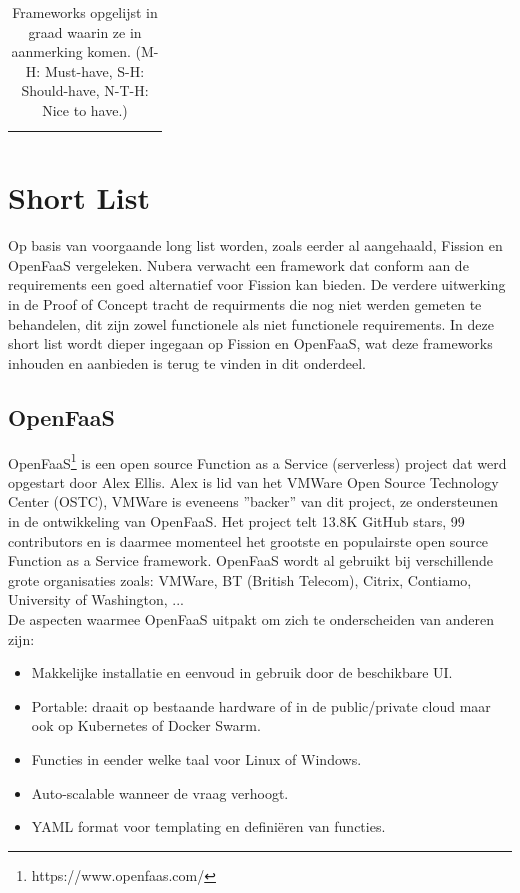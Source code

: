 \begin{table}[]
{\begin{tabular}{@{}llccccccccc@{}}
            &  & \multicolumn{1}{l}{} & \multicolumn{1}{l}{} & \multicolumn{1}{l}{} & \multicolumn{1}{l}{} & \multicolumn{1}{l}{} & \multicolumn{1}{l}{} & \multicolumn{1}{l}{} & \multicolumn{1}{l}{} & \multicolumn{1}{l}{} \\ \bottomrule
        \end{tabular}%
    }
    \caption{Frameworks opgelijst in graad waarin ze in aanmerking komen. (M-H: Must-have, S-H: Should-have, N-T-H: Nice to have.) }
    \label{tab:frameworks-samenvattingl}
\end{table}

\section{Short List}
\label{sec:short-list}
Op basis van voorgaande long list worden, zoals eerder al aangehaald, Fission en OpenFaaS vergeleken. Nubera verwacht een framework dat conform aan de requirements een goed alternatief voor Fission kan bieden. De verdere uitwerking in de Proof of Concept tracht de requirments die nog niet werden gemeten te behandelen, dit zijn zowel functionele als niet functionele requirements. In deze short list wordt dieper ingegaan op Fission en OpenFaaS, wat deze frameworks inhouden en aanbieden is terug te vinden in dit onderdeel.

\subsection{OpenFaaS}
OpenFaaS\footnote{https://www.openfaas.com/} is een open source Function as a Service (serverless) project dat werd opgestart door Alex Ellis. Alex is lid van het VMWare Open Source Technology Center (OSTC), VMWare is eveneens ''backer'' van dit project, ze ondersteunen in de ontwikkeling van OpenFaaS. Het project telt 13.8K GitHub stars, 99 contributors en is daarmee momenteel het grootste en populairste open source Function as a Service framework. OpenFaaS wordt al gebruikt bij verschillende grote organisaties zoals: VMWare, BT (British Telecom), Citrix, Contiamo, University of Washington, ... 
\\
De aspecten waarmee OpenFaaS uitpakt om zich te onderscheiden van anderen zijn: \autocite{OpenFaaS2019}
\begin{itemize}
    \item Makkelijke installatie en eenvoud in gebruik door de beschikbare UI.
    \item Portable: draait op bestaande hardware of in de public/private cloud maar ook op Kubernetes of Docker Swarm.
    \item Functies in eender welke taal voor Linux of Windows.
    \item Auto-scalable wanneer de vraag verhoogt.
    \item YAML format voor templating en definiëren van functies.
\end{itemize}
